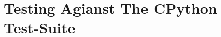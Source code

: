 \documentclass{l4proj}
\begin{document}
\section{Testing Agianst The CPython Test-Suite}








\end{document}
